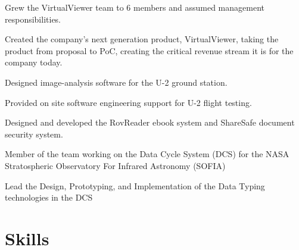 \documentclass[letterpaper,10pt]{article}
\begin{document}
     
  \begin{resume_list}
    \item Grew the VirtualViewer team to 6 members and assumed management responsibilities.
  \end{resume_list}

  \begin{resume_list}
      \item Created the company's next generation product, VirtualViewer, taking the product from proposal to PoC, creating the critical revenue stream it is for the company today.
  \end{resume_list}

  \begin{resume_list}
    \item Designed image-analysis software for the U-2 ground station.
    \item Provided on site software engineering support for U-2 flight testing.
  \end{resume_list}
  
  \begin{resume_list}
      \item Designed and developed the RovReader ebook system and ShareSafe document security system.
  \end{resume_list}
  
  \begin{resume_list}
    \item Member of the team working on the Data Cycle System (DCS) for the NASA Stratospheric Observatory For Infrared Astronomy (SOFIA)
    \item Lead the Design, Prototyping, and Implementation of the Data Typing technologies in the DCS 
  \end{resume_list}


    \section{Skills}
\end{document}
